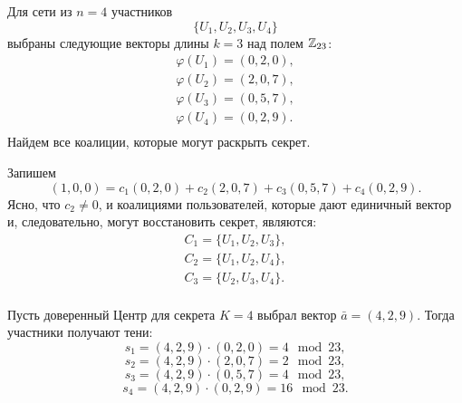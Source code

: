 %
%
%
%

\example
Для сети из $n=4$ участников
    \[ \{ U_1, U_2, U_3, U_4 \} \]
выбраны следующие векторы длины $k=3$ над полем $\mathbb{Z}_{23}$:
\[ \begin{array}{l}
    \varphi(U_1) = (0,2,0), \\
    \varphi(U_2) = (2,0,7), \\
    \varphi(U_3) = (0,5,7), \\
    \varphi(U_4) = (0,2,9). \\
\end{array} \]
Найдем все коалиции, которые могут раскрыть секрет.

Запишем
    \[ (1,0,0) = c_1 (0,2,0) + c_2 (2,0,7) + c_3 (0,5,7) + c_4 (0,2,9). \]
Ясно, что $c_2 \neq 0$, и коалициями пользователей, которые дают единичный вектор и, следовательно, могут восстановить секрет, являются:
\[ \begin{array}{l}
    C_1 = \{ U_1, U_2, U_3 \}, \\
    C_2 = \{ U_1, U_2, U_4 \}, \\
    C_3 = \{ U_2, U_3, U_4 \}. \\
\end{array} \]

Пусть доверенный Центр для секрета $K=4$ выбрал вектор $\bar{a} = (4, 2, 9)$. Тогда участники получают тени:
    \[ s_1 = (4,2,9) \cdot (0,2,0) = 4 \mod 23, \]
    \[ s_2 = (4,2,9) \cdot (2,0,7) = 2 \mod 23, \]
    \[ s_3 = (4,2,9) \cdot (0,5,7) = 4 \mod 23, \]
    \[ s_4 = (4,2,9) \cdot (0,2,9) = 16 \mod 23. \]

